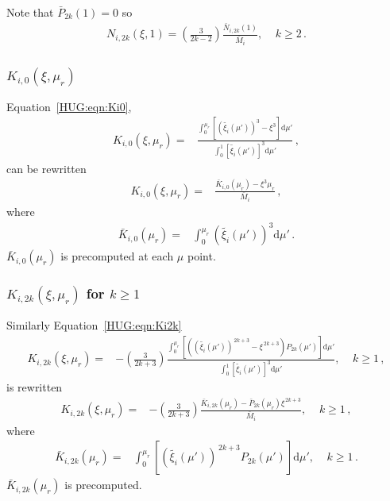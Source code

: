 \documentclass[11pt, oneside]{article}   	%
\begin{document}
Note that $\bar{P}_{2k}(1)=0$ so
% 
\begin{align}
N_{i,2k}(\xi,1) = \left ( \frac{3}{2k-2} \right ) \frac{  \bar{N}_{i,2k}(1)  }{\bar{M}_i }, \; \;\;\; k \ge 2 \,.
\end{align}
%

\subsubsection{\boldmath$K_{i,0}(\xi,\mu_r)$}
Equation~\ref{HUG:eqn:Ki0},
%
\begin{align}
K_{i,0}(\xi,\mu_r)  = {} &  \frac{ \int_{0}^{\mu_r} \left [ (\tilde{\xi_i}(\mu'))^3 - \xi^3 \right ] \mathrm{d}\mu' }{\int_{0}^{1} \left [ \tilde{\xi_i}(\mu') \right ]^3 \mathrm{d}\mu' } \,,
\end{align}
can be rewritten
%
\begin{align}
K_{i,0}(\xi,\mu_r)  = {} &  \frac{ \bar{K}_{i,0}(\mu_r)- \xi^3 \mu_r}{\bar{M}_i } \,,
\end{align}
where
%
\begin{align}
 \bar{K}_{i,0}(\mu_r) = {} & \int_{0}^{\mu_r}  (\tilde{\xi_i}(\mu'))^3  \mathrm{d}\mu' \,.
\end{align}
%
$\bar{K}_{i,0}(\mu_r)$ is  precomputed at each $\mu$ point.

\subsubsection{\boldmath$K_{i,2k}(\xi,\mu_r)$ for  $k \ge 1 $}
Similarly Equation~\ref{HUG:eqn:Ki2k}
%
\begin{align}
K_{i,2k}(\xi,\mu_r) =  {} & - \left ( \frac{3}{2k+3} \right ) \frac{ \int_{0}^{\mu_r} \left [ \left ( (\tilde{\xi_i}(\mu'))^{\, 2k+3} - \xi^{\, 2k+3} \right ) P_{2k}(\mu') \right ] \mathrm{d}\mu' }{\int_{0}^{1} \left [ \tilde{\xi_i}(\mu') \right ]^3 \mathrm{d}\mu' }, \; \;\;\; k \ge 1 \,,
\end{align}
%
is rewritten
%
\begin{align}
K_{i,2k}(\xi,\mu_r) =  {} & - \left ( \frac{3}{2k+3} \right ) \frac{  \bar{K}_{i,2k}(\mu_r) - \bar{P}_{2k}(\mu_r) \xi^{\, 2k+3} }{\bar{M}_i }, \; \;\;\; k \ge 1 \,,
\end{align}
%
where
%
\begin{align}
 \bar{K}_{i,2k}(\mu_r) = {} & \int_{0}^{\mu_r} \left [ (\tilde{\xi_i}(\mu'))^{\, 2k+3} P_{2k}(\mu') \right ] \mathrm{d}\mu' , \; \;\;\; k \ge 1 \,. 
\end{align}
%
$\bar{K}_{i,2k}(\mu_r) $ is precomputed.
\end{document}
